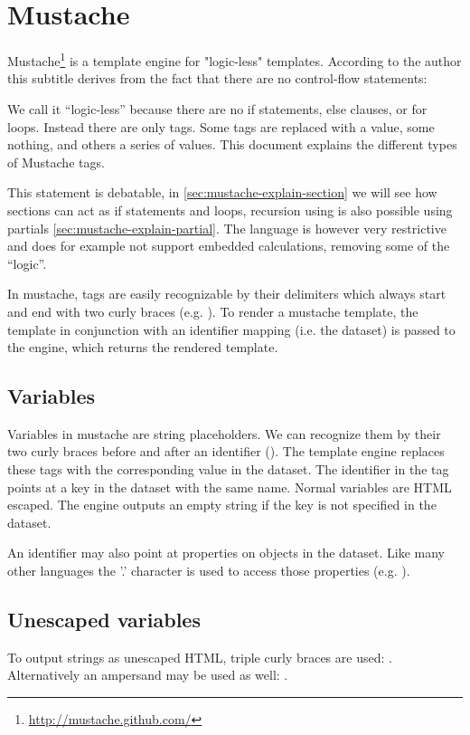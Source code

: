 \documentclass[thesis.tex]{subfiles}
\begin{document}
\chapter{Mustache}
\label{chap:mustache}
Mustache\footnote{\url{http://mustache.github.com/}} is a template engine for
"logic-less" templates.
According to the author this subtitle derives from the fact that there are no
control-flow statements:
\begin{citequote}{\cite{MUSTACHE5}}
We call it ``logic-less'' because there are no if statements, else clauses, or for
loops. Instead there are only tags. Some tags are replaced with a value, some
nothing, and others a series of values. This document explains the different
types of Mustache tags.
\end{citequote}
This statement is debatable, in \ref{sec:mustache-explain-section} we will see
how sections can act as if statements and loops, recursion using is also
possible using partials \ref{sec:mustache-explain-partial}.
The language is however very restrictive and does for example not support
embedded calculations, removing some of the ``logic''. 

In mustache, tags are easily recognizable by their delimiters which always start
and end with two curly braces (e.g. ).
To render a mustache template, the template in conjunction with an
identifier mapping (i.e. the dataset) is passed to the engine, which returns the
rendered template.

\section{Variables}
\label{sect:mustache-vars}
Variables in mustache are string placeholders. We can recognize them by their
two curly braces before and after an identifier ().
The template engine replaces these tags with the corresponding value in the
dataset.
The identifier in the tag points at a key in the dataset with the same name.
Normal variables are HTML escaped. The engine outputs an empty string if the
key is not specified in the dataset.

An identifier may also point at properties on objects in the dataset. Like many
other languages the '.' character is used to access those properties (e.g.
).

\section{Unescaped variables}
To output strings as unescaped HTML, triple curly braces are used:
. Alternatively an ampersand may be used as well:
.
\end{document}
